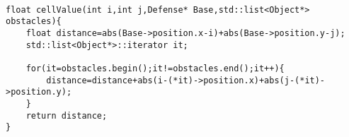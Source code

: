 \begin{lstlisting}

float cellValue(int i,int j,Defense* Base,std::list<Object*> obstacles){
	float distance=abs(Base->position.x-i)+abs(Base->position.y-j);
	std::list<Object*>::iterator it;

	for(it=obstacles.begin();it!=obstacles.end();it++){
		distance=distance+abs(i-(*it)->position.x)+abs(j-(*it)->position.y);
	}
	return distance;
}

\end{lstlisting}